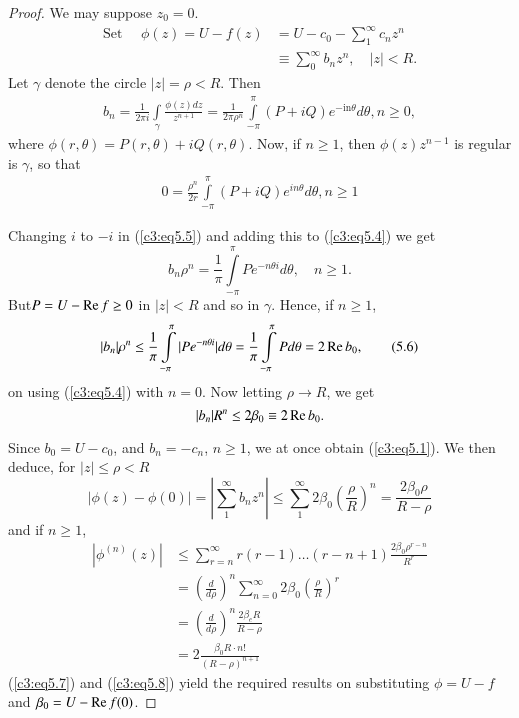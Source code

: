 \begin{proof}
We may suppose $z_0 = 0$.
\begin{align*}
\text{Set } \quad \phi (z) = U - f(z) & = U - c_0 -
\sum\limits^{\infty}_1 c_n z^n \\
& \equiv \sum\limits^\infty_0 b_n z^n, \quad |z| <R.
\end{align*}
Let $\gamma$ denote the circle $|z| = \rho < R$. Then
\begin{align*}
b_n = \frac{1}{2\pi i} \int\limits_{\gamma} \frac{\phi(z)dz}{z^{n+1}}
= \frac{1}{2\pi \rho^n} \int\limits^\pi_{-\pi} (P +
iQ)e^{-\text{in}\theta} d \theta, n \geq 0, \tag{5.4}\label{c3:eq5.4}
\end{align*}
where $\phi (r, \theta) = P(r, \theta) + i Q (r, \theta)$. Now, if $n
\geq 1$, then $\phi (z) z^{n-1}$ is regular is $\gamma$, so that
\begin{align*}
0 = \frac{\rho^n}{2r} \int\limits^\pi_{-\pi} (P+iQ) e^{in\theta} d
\theta, n \geq 1 \tag{5.5}\label{c3:eq5.5}
\end{align*}

Changing $i$ to $-i$ in (\ref{c3:eq5.5}) and adding this to (\ref{c3:eq5.4}) we get
$$
b_n \rho^n = \frac{1}{\pi} \int\limits^\pi_{-\pi} P e^{-n \theta i}
d\theta, \quad n \geq 1.
$$
But\pageoriginale $P= U - \operatorname{Re} f \geq 0$ in $|z| < R$ and so in
$\gamma$. Hence, if  $n \geq 1$,
\begin{equation*}
|b_n| \rho^n \leq \frac{1}{\pi} \int\limits^\pi_{-\pi} |P e^{-n\theta
  i}| d \theta = \frac{1}{\pi} \int\limits^{\pi}_{-\pi} P d \theta = 2
\operatorname{Re} b_0, \tag{5.6}\label{c3:eq5.6}
\end{equation*}
on using (\ref{c3:eq5.4}) with $n=0$. Now letting $\rho \to R$, we get
$$
|b_n| R^n \leq 2 \beta_0 \equiv 2 \operatorname{Re} b_0.
$$

Since $b_0 = U - c_0$, and $b_n = - c_n$, $n \geq 1$, we at once
obtain (\ref{c3:eq5.1}). We then deduce, for $|z| \leq \rho < R$
\begin{equation*}
|\phi (z) - \phi (0)| = \left|\sum\limits^\infty_1 b_n z^n\right| \leq
\sum\limits^\infty_1 2 \beta_0 \left( \frac{\rho}{R}\right)^n =
\frac{2\beta_0\rho}{R-\rho}  \tag{5.7} \label{c3:eq5.7}
\end{equation*}
and if $n \geq 1$,
\begin{align*}
|\phi^{(n)} (z)| & \leq \sum\limits^\infty_{r=n} r(r-1) \ldots (r-n+1)
\frac{2\beta_0 \rho^{r-n}}{R^r}\\
& = \left(\frac{d}{d\rho} \right)^n \sum\limits^\infty_{n=0} 2 \beta_0
\left(\frac{\rho}{R} \right)^r\\
& = \left(\frac{d}{d\rho} \right)^n \frac{2\beta_e R}{R-\rho}\\
& = 2 \frac{\beta_0 R\cdot n!}{(R-\rho)^{n+1}} \tag{5.8}\label{c3:eq5.8}
\end{align*}
(\ref{c3:eq5.7}) and (\ref{c3:eq5.8}) yield the required results on substituting $\phi =
U - f$ and $\beta_0 = U - \operatorname{Re} f(0)$.
\end{proof}


